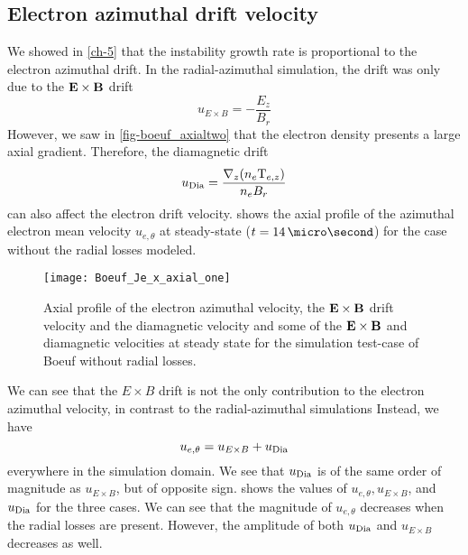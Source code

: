 
\subsection{Electron azimuthal drift velocity} \label{subsec-drift}

  We showed in \cref{ch-5} that the instability growth rate is proportional to the electron azimuthal drift.
  In the radial-azimuthal simulation, the drift was only due to the ${\mathbf E} \times {\mathbf B}$ drift
  \begin{equation} \label{eq-exbdrift}
    u_{E \times B} = - \frac{E_z}{B_r}
  \end{equation}
  However, we saw in \cref{fig-boeuf_axialtwo} that the electron density presents a large axial gradient.
  Therefore, the diamagnetic drift
  $$u_{\rm Dia}=\frac{\nabla_z (n_e {\rm T}_{e,z})}{n_e B_r}$$
  can also affect the electron drift velocity.
   shows the axial profile of the azimuthal electron mean velocity $u_{e, \theta}$ at steady-state ($t = 14\,\micro\second$) for the case without the radial losses modeled.

 
  \begin{figure}[hbt]
    \centering
    \texttt{[image: Boeuf\_Je\_x\_axial\_one]}
    \caption{Axial profile of the electron azimuthal velocity, the ${\mathbf E} \times {\mathbf B}$ drift velocity and the diamagnetic velocity and some of the ${\mathbf E} \times {\mathbf B}$ and diamagnetic velocities at steady state for the simulation test-case of Boeuf without radial losses.}
    \label{fig-Jetheta_sum}
  \end{figure}
  
  We can see that the $E \times B$ drift is not the only contribution to the electron azimuthal velocity, in contrast to the radial-azimuthal simulations
  Instead, we have 
  $$ u_{e, \theta} =   u_{E \times B} + u_{\rm Dia}$$
  everywhere in the simulation domain.
  We see that $u_{\rm Dia}$ is of the same order of magnitude as $u_{E \times B}$, but of opposite sign.
   shows the values of $ u_{e, \theta},   u_{E \times B}$, and $u_{\rm Dia}$ for the three cases.
  We can see that the magnitude of $u_{e, \theta} $ decreases when the radial losses are present.
  However, the amplitude of both $u_{\rm Dia}$ and $u_{E \times B}$ decreases as well.


